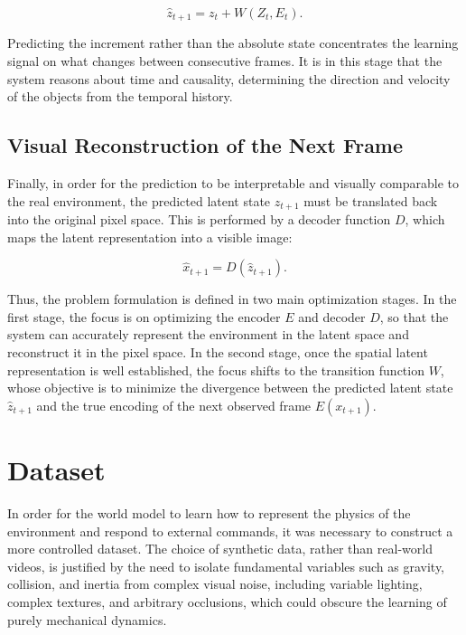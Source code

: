 \documentclass[conference]{IEEEtran}
\begin{document}
\begin{equation}
    \hat{z}_{t+1} = z_t + W(Z_t, E_t).
\end{equation}

Predicting the increment rather than the absolute state concentrates the learning signal on what changes between consecutive frames. It is in this stage that the system reasons about time and causality, determining the direction and velocity of the objects from the temporal history.

\subsection{Visual Reconstruction of the Next Frame}

Finally, in order for the prediction to be interpretable and visually comparable to the real environment, the predicted latent state \(\hat{z}_{t+1}\) must be translated back into the original pixel space. This is performed by a decoder function \(D\), which maps the latent representation into a visible image:

\begin{equation}
    \hat{x}_{t+1} = D(\hat{z}_{t+1}).
\end{equation}

Thus, the problem formulation is defined in two main optimization stages. In the first stage, the focus is on optimizing the encoder \(E\) and decoder \(D\), so that the system can accurately represent the environment in the latent space and reconstruct it in the pixel space. In the second stage, once the spatial latent representation is well established, the focus shifts to the transition function \(W\), whose objective is to minimize the divergence between the predicted latent state \(\hat{z}_{t+1}\) and the true encoding of the next observed frame \(E(x_{t+1})\).

\section{Dataset}
\label{sec:dataset}

In order for the world model to learn how to represent the physics of the environment and respond to external commands, it was necessary to construct a more controlled dataset. The choice of synthetic data, rather than real-world videos, is justified by the need to isolate fundamental variables such as gravity, collision, and inertia from complex visual noise, including variable lighting, complex textures, and arbitrary occlusions, which could obscure the learning of purely mechanical dynamics.
\end{document}
